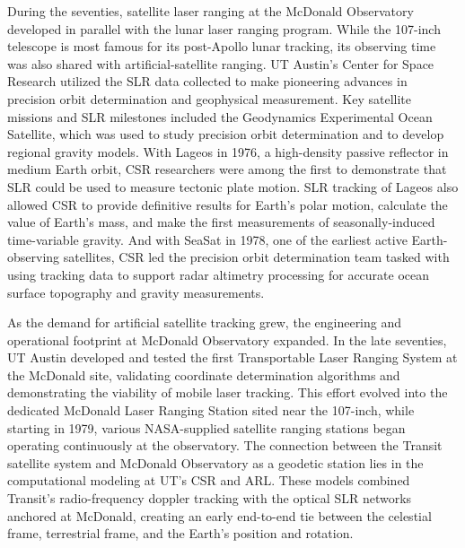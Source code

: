 During the seventies, satellite laser ranging at the McDonald Observatory developed in parallel with the lunar laser ranging program. While the 107-inch telescope is most famous for its post-Apollo lunar tracking, its observing time was also shared with artificial-satellite ranging. UT Austin's Center for Space Research utilized the SLR data collected to make pioneering advances in precision orbit determination and geophysical measurement. Key satellite missions and SLR milestones included the Geodynamics Experimental Ocean Satellite, which was used to study precision orbit determination and to develop regional gravity models. With Lageos in 1976, a high-density passive reflector in medium Earth orbit, CSR researchers were among the first to demonstrate that SLR could be used to measure tectonic plate motion. SLR tracking of Lageos also allowed CSR to provide definitive results for Earth's polar motion, calculate the value of Earth's mass, and make the first measurements of seasonally-induced time-variable gravity. And with SeaSat in 1978, one of the earliest active Earth-observing satellites, CSR led the precision orbit determination team tasked with using tracking data to support radar altimetry processing for accurate ocean surface topography and gravity measurements. 

As the demand for artificial satellite tracking grew, the engineering and operational footprint at McDonald Observatory expanded. In the late seventies, UT Austin developed and tested the first Transportable Laser Ranging System at the McDonald site, validating coordinate determination algorithms and demonstrating the viability of mobile laser tracking. This effort evolved into the dedicated McDonald Laser Ranging Station sited near the 107-inch, while starting in 1979, various NASA-supplied satellite ranging stations began operating continuously at the observatory. The connection between the Transit satellite system and McDonald Observatory as a geodetic station lies in the computational modeling at UT’s CSR and ARL. These models combined Transit's radio-frequency doppler tracking with the optical SLR networks anchored at McDonald, creating an early end-to-end tie between the celestial frame, terrestrial frame, and the Earth’s position and rotation.

